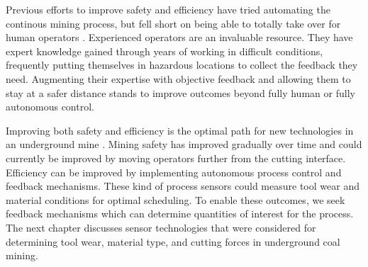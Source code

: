Previous efforts to improve safety and efficiency have tried automating the continous mining process,
but fell short on being able to totally take over for human operators \cite{11124/170545, schiffbauer1988testbed}. 
Experienced operators are an invaluable resource. 
They have expert knowledge gained through years of working in difficult conditions,
frequently putting themselves in hazardous locations to collect the feedback they need.
Augmenting their expertise with objective feedback and allowing them to stay at a safer distance
stands to improve outcomes beyond fully human or fully autonomous control.

Improving both safety and efficiency is the optimal path for new technologies in an underground mine \cite{Sider1983}.
Mining safety has improved gradually over time and could currently 
be improved by moving operators further from the cutting interface.
Efficiency can be improved by implementing autonomous process control and feedback mechanisms.
These kind of process sensors could measure tool wear and material conditions for optimal scheduling.
To enable these outcomes, we seek feedback mechanisms which can determine quantities of interest for the process.
The next chapter discusses sensor technologies that were considered for 
determining tool wear, material type, and cutting forces in underground coal mining.

